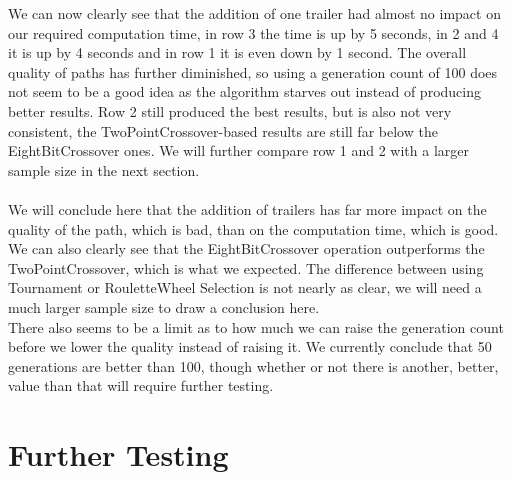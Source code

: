 We can now clearly see that the addition of one trailer had almost no impact on our required computation time, in row 3 the time is up by 5 seconds, in 2 and 4 it is up by 4 seconds and in row 1 it is even down by 1 second. The overall quality of paths has further diminished, so using a generation count of 100 does not seem to be a good idea as the algorithm starves out instead of producing better results. Row 2 still produced the best results, but is also not very consistent, the TwoPointCrossover-based results are still far below the EightBitCrossover ones. We will further compare row 1 and 2 with a larger sample size in the next section.\\
\\
We will conclude here that the addition of trailers has far more impact on the quality of the path, which is bad, than on the computation time, which is good. We can also clearly see that the EightBitCrossover operation outperforms the TwoPointCrossover, which is what we expected. The difference between using Tournament or RouletteWheel Selection is not nearly as clear, we will need a much larger sample size to draw a conclusion here. \\
There also seems to be a limit as to how much we can raise the generation count before we lower the quality instead of raising it. We currently conclude that 50 generations are better than 100, though whether or not there is another, better, value than that will require further testing.\\

\section{Further Testing}
\label{sec:further_testing}

